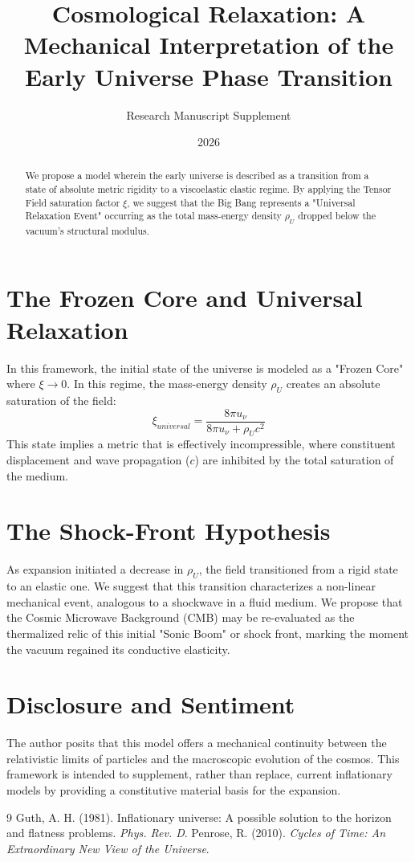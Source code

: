 \documentclass[11pt]{article}
\title{\textbf{Cosmological Relaxation: A Mechanical Interpretation of the Early Universe Phase Transition}}
\author{Research Manuscript Supplement}
\date{2026}
\begin{document}
\maketitle

\begin{abstract}
We propose a model wherein the early universe is described as a transition from a state of absolute metric rigidity to a viscoelastic elastic regime. By applying the Tensor Field saturation factor $\xi$, we suggest that the Big Bang represents a "Universal Relaxation Event" occurring as the total mass-energy density $\rho_U$ dropped below the vacuum's structural modulus.
\end{abstract}

\section{The Frozen Core and Universal Relaxation}
In this framework, the initial state of the universe is modeled as a "Frozen Core" where $\xi \to 0$. In this regime, the mass-energy density $\rho_U$ creates an absolute saturation of the field:
\begin{equation}
\xi_{universal} = \frac{8\pi u_\nu}{8\pi u_\nu + \rho_U c^2}
\end{equation}
This state implies a metric that is effectively incompressible, where constituent displacement and wave propagation ($c$) are inhibited by the total saturation of the medium.

\section{The Shock-Front Hypothesis}
As expansion initiated a decrease in $\rho_U$, the field transitioned from a rigid state to an elastic one. We suggest that this transition characterizes a non-linear mechanical event, analogous to a shockwave in a fluid medium. We propose that the Cosmic Microwave Background (CMB) may be re-evaluated as the thermalized relic of this initial "Sonic Boom" or shock front, marking the moment the vacuum regained its conductive elasticity.

\section{Disclosure and Sentiment}
The author posits that this model offers a mechanical continuity between the relativistic limits of particles and the macroscopic evolution of the cosmos. This framework is intended to supplement, rather than replace, current inflationary models by providing a constitutive material basis for the expansion.

\begin{thebibliography}{9}
 Guth, A. H. (1981). Inflationary universe: A possible solution to the horizon and flatness problems. \textit{Phys. Rev. D}.
 Penrose, R. (2010). \textit{Cycles of Time: An Extraordinary New View of the Universe}.
\end{thebibliography}
\end{document}

